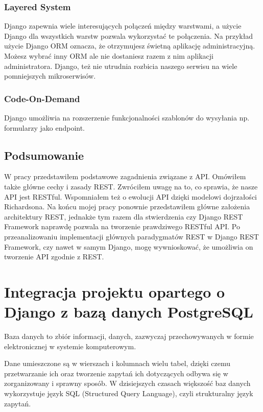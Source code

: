 \documentclass[oneside,polski,logo,indent]{amuthesis}
\begin{document}
\begin{center}
\subsection{Layered System}
\end{center}
Django zapewnia wiele interesujących połączeń między warstwami, a użycie Django dla wszystkich warstw pozwala wykorzystać te połączenia. Na przykład użycie Django ORM oznacza, że otrzymujesz świetną aplikację administracyjną. Możesz wybrać inny ORM ale nie dostaniesz razem z nim aplikacji administratora. Django, też nie utrudnia rozbicia naszego serwisu na wiele pomniejszych mikroserwisów. 


\begin{center}
\subsection{Code-On-Demand}
\end{center}
Django umożliwia na rozszerzenie funkcjonalności szablonów do wysyłania np. formularzy jako endpoint.

\section{Podsumowanie}
W pracy przedstawiłem podstawowe zagadnienia związane z API. Omówiłem także główne cechy i zasady REST. Zwróciłem uwagę na to, co sprawia, że nasze API jest RESTful. Wspomniałem też o ewolucji API dzięki modelowi dojrzałości Richardsona. Na końcu mojej pracy ponownie przedstawiłem główne założenia architektury REST, jednakże tym razem dla stwierdzenia czy Django REST Framework naprawdę pozwala na tworzenie prawdziwego RESTful API. Po przeanalizowaniu implementacji głównych paradygmatów REST w Django REST Framework, czy nawet w samym Django, mogę wywnioskować, że umożliwia on tworzenie API zgodnie z REST.

\chapter{Integracja projektu opartego o Django z bazą danych PostgreSQL}
Baza danych to zbiór informacji, danych, zazwyczaj przechowywanych w formie elektronicznej w systemie komputerowym.  

Dane umieszczone są w wierszach i kolumnach wielu tabel, dzięki czemu przetwarzanie ich oraz tworzenie zapytań ich dotyczących odbywa się w zorganizowany i sprawny sposób. W dzisiejszych czasach większość baz danych wykorzystuje język SQL (Structured Query Language), czyli strukturalny język zapytań.  
\end{document}
